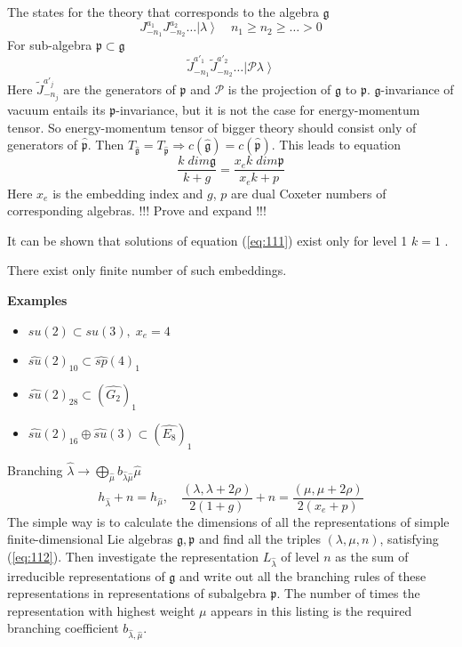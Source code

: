 \documentclass[a4paper,12pt]{article}
\theoremstyle{definition} \newtheorem{Def}{Definition}
\begin{document}
The states for the theory that corresponds to the algebra $\mathfrak{g}$
\begin{equation}
  \label{eq:109}
  J^{a_1}_{-n_1}J^{a_2}_{-n_2}\dots\left|\lambda\right>\quad n_1\geq n_2\geq\dots>0
\end{equation}
For sub-algebra $\mathfrak{p}\subset\mathfrak{g}$
\begin{equation}
  \label{eq:110}
  \tilde{J}^{a'_1}_{-n_1}\tilde{J}^{a'_2}_{-n_2}\dots\left|\mathcal{P}\lambda\right>
\end{equation}
Here $\tilde{J}^{a'_j}_{-n_j}$ are the generators of $\mathfrak{p}$ and $\mathcal{P}$ is the projection of $\mathfrak{g}$ to $\mathfrak{p}$. $\mathfrak{g}$-invariance of vacuum entails its $\mathfrak{p}$-invariance, but it is not the case for energy-momentum tensor. So energy-momentum tensor of bigger theory should consist only of generators of $\hat{\mathfrak{p}}$. Then $T_{\hat{\mathfrak{g}}}=T_{\hat{\mathfrak{p}}}\Rightarrow c(\hat{\mathfrak{g}})=c(\hat{\mathfrak{p}})$. This leads to equation
\begin{equation}
  \label{eq:111}
  \frac{k\;dim\mathfrak{g}}{k+g}=\frac{x_e k\; dim\mathfrak{p}}{x_ek+p}
\end{equation}
Here $x_e$ is the embedding index and $g$, $p$ are dual Coxeter numbers of corresponding algebras. !!! Prove and expand !!!

It can be shown that solutions of equation (\ref{eq:111}) exist only
for level 1 $k=1$ \cite{difrancesco1997cft}.

There exist only finite number of such embeddings.

{\bf Examples}
\begin{itemize}
\item $su(2)\subset su(3),\; x_e=4$
\item $\hat{su}(2)_{10}\subset\hat{sp}(4)_1$
\item $\hat{su}(2)_{28}\subset(\hat{G_2})_1$
\item $\hat{su}(2)_{16}\oplus\hat{su}(3)\subset (\hat{E_8})_1$
\end{itemize}

Branching $\hat{\lambda}\to \bigoplus_{\hat{\mu}}b_{\hat{\lambda}\hat{\mu}}\hat{\mu}$
\begin{equation}
  \label{eq:112}
  h_{\hat{\lambda}}+n=h_{\hat{\mu}},\quad \frac{(\lambda,\lambda+2\rho)}{2(1+g)}+n=\frac{(\mu,\mu+2\rho)}{2(x_e+p)}
\end{equation}
The simple way is to calculate the dimensions of all the representations of simple finite-dimensional Lie algebras $\mathfrak{g},\mathfrak{p}$ and find all the triples $(\lambda,\mu,n)$, satisfying (\ref{eq:112}). Then investigate the representation $L_{\hat{\lambda}}$ of level $n$ as the sum of irreducible representations of $\mathfrak{g}$ and write out all the branching rules of these representations in representations of subalgebra $\mathfrak{p}$. The number of times the representation with highest weight $\mu$ appears in this listing is the required branching coefficient $b_{\hat{\lambda},\hat{\mu}}$.
\end{document}
